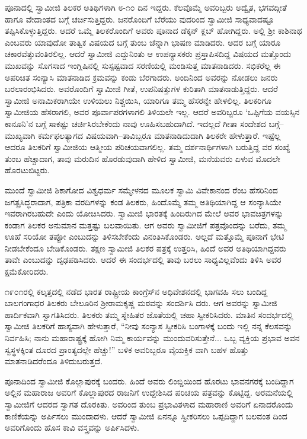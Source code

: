 ಪೂನಾದಲ್ಲಿ ಸ್ವಾಮೀಜಿ ತಿಲಕರ ಅತಿಥಿಗಳಾಗಿ ೮-೧೦ ದಿನ ಇದ್ದರು. ಕೆಲವೊಮ್ಮೆ ಅವರಿಬ್ಬರು ಅದ್ವೈತ, ಭಗವದ್ಗೀತೆ ಹಾಗೂ ವೇದಾಂತದ ಬಗ್ಗೆ ಚರ್ಚಿಸುತ್ತಿದ್ದರು. ಜನರೊಂದಿಗೆ ಬೆರೆಯು ವುದರಿಂದ ಸ್ವಾಮೀಜಿ ಸಾಧ್ಯವಾದಷ್ಟೂ ತಪ್ಪಿಸಿಕೊಳ್ಳುತ್ತಿದ್ದರು. ಆದರೆ ಒಮ್ಮೆ ತಿಲಕರೊಂದಿಗೆ ಅವರು ಪೂನಾದ ಡೆಕ್ಕನ್ ಕ್ಲಬ್ ಹೋಗಿದ್ದರು. ಅಲ್ಲಿ ಶ್ರೀ ಕಾಶಿನಾಥ ಎಂಬವರು ಯಾವುದೋ ತಾತ್ವಿಕ ವಿಷಯದ ಬಗ್ಗೆ ತುಂಬ ಚೆನ್ನಾಗಿ ಭಾಷಣ ಮಾಡಿದರು. ಅದರ ಬಗ್ಗೆ ಯಾರೂ ಚಕಾರವೆತ್ತುವಂತಿರಲಿಲ್ಲ. ಆದರೆ ಸ್ವಾಮೀಜಿ ಎದ್ದುನಿಂತು ಆ ಉಪನ್ಯಾಸಕರು ಪ್ರಸ್ತಾಪಿಸದಿದ್ದ ವಿಷಯದ ಮತ್ತೊಂದು ಮುಖವನ್ನು ಸೊಗಸಾದ ಇಂಗ್ಲಿಷಿನಲ್ಲಿ ಸುಸ್ಪಷ್ಟವಾದ ಸರಣಿಯಲ್ಲಿ ಮಂಡಿಸುತ್ತ ಮಾತನಾಡಿದರು. ಸಭಿಕರೆಲ್ಲ ಈ ಅಪರಿಚಿತ ಸಂನ್ಯಾಸಿ ಮಾತನಾಡಿದ ಕ್ರಮವನ್ನು ಕಂಡು ಬೆರಗಾದರು. ಅಂದಿನಿಂದ ಅವರನ್ನು ನೋಡಲು ಜನರು ಬರಲಾರಂಭಿಸಿದರು. ಅವರೊಂದಿಗೆ ಸ್ವಾಮೀಜಿ ಗೀತೆ, ಉಪನಿಷತ್ತುಗಳ ಕುರಿತಾಗಿ ಮಾತನಾಡುತ್ತಿದ್ದರು. ಆದರೆ ಸ್ವಾಮೀಜಿ ಅನಾಮಿಕರಾಗಿಯೇ ಉಳಿಯಲು ನಿಶ್ಚಯಿಸಿ, ಯಾರಿಗೂ ತಮ್ಮ ಹೆಸರನ್ನೇ ಹೇಳಲಿಲ್ಲ. ತಿಲಕರಿಗೂ ಸ್ವಾಮೀಜಿಯ ಹೆಸರಾಗಲಿ, ಅವರ ಪೂರ್ವಾಪರಗಳಾಗಲಿ ತಿಳಿಯಲೇ ಇಲ್ಲ. ಆದರೆ ಅವರಿಬ್ಬರೂ ‘ಒಪ್ಪಿಗೆಯ ವಯಸ್ಸಿನ ಕಾನೂನಿ’ನ ಬಗ್ಗೆ ಸಾಕಷ್ಟು ಚರ್ಚಿಸಿರಬೇಕೆಂದು ನಾವು ಊಹಿಸಬಹುದಾಗಿದೆ. ಇದಲ್ಲದೆ ಗೀತಾ ಸಂದೇಶದ ಬಗ್ಗೆ–ಮುಖ್ಯವಾಗಿ ಕರ್ಮಫಲತ್ಯಾಗದ ವಿಷಯವಾಗಿ–ತಾವಿಬ್ಬರೂ ಮಾತನಾಡಿದುದಾಗಿ ತಿಲಕರೇ ಹೇಳುತ್ತಾರೆ. ಇಷ್ಟೆಲ್ಲ ಆದರೂ ತಿಲಕರಿಗೆ ಸ್ವಾಮೀಜಿಯ ಆತ್ಮೀಯ ಪರಿಚಯವಾಗಲಿಲ್ಲ. ತಮ್ಮ ದರ್ಶನಾರ್ಥಿಗಳಾಗಿ ಬರುತ್ತಿದ್ದ ವರ ಸಂಖ್ಯೆ ತುಂಬ ಹೆಚ್ಚಾದಾಗ, ತಾವು ಮರುದಿನ ಹೊರಡುವುದಾಗಿ ಹೇಳಿದ ಸ್ವಾಮೀಜಿ, ಮನೆಯವರು ಏಳುವ ಮೊದಲೇ ಹೊರಟುಬಿಟ್ಟರು.

ಮುಂದೆ ಸ್ವಾಮೀಜಿ ಶಿಕಾಗೋದ ವಿಶ್ವಧರ್ಮ ಸಮ್ಮೇಳನದ ಮೂಲಕ ಸ್ವಾಮಿ ವಿವೇಕಾನಂದ ರೆಂಬ ಹೆಸರಿನಿಂದ ಜಗತ್ಪ್ರಸಿದ್ಧರಾದಾಗ, ಪತ್ರಿಕಾ ವರದಿಗಳನ್ನು ಕಂಡ ತಿಲಕರು, ಹಿಂದೊಮ್ಮೆ ತಮ್ಮ ಅತಿಥಿಯಾಗಿದ್ದ ಆ ಸಂನ್ಯಾಸಿಯೇ ಇವರಾಗಿರಬಹುದೇ ಎಂದು ಯೋಚಿಸಿದರು. ಸ್ವಾಮೀಜಿ ಭಾರತಕ್ಕೆ ಹಿಂದಿರುಗಿದ ಮೇಲೆ ಅವರ ಭಾವಚಿತ್ರಗಳನ್ನು ಕಂಡಾಗ ತಿಲಕರ ಅನುಮಾನ ಮತ್ತಷ್ಟು ಬಲವಾಯಿತು. ಆಗ ಅವರು ಸ್ವಾಮೀಜಿಗೆ ಪತ್ರವೊಂದನ್ನು ಬರೆದು, ತಮ್ಮ ಊಹೆ ಸರಿಯೋ ತಪ್ಪೋ ಎಂಬುದನ್ನು ತಿಳಿಸಬೇಕೆಂದು ವಿನಂತಿಸಿಕೊಂಡರು. ಅಲ್ಲದೆ ಮತ್ತೊಮ್ಮೆ ಪೂನಾಗೆ ಭೇಟಿ ನೀಡಬೇಕೆಂದೂ ಬೇಡಿಕೊಂಡರು. ತಕ್ಷಣ ಸ್ವಾಮೀಜಿ ತಿಲಕರ ಪತ್ರಕ್ಕೆ ಉತ್ತರಿಸಿ, ಹಿಂದೆ ಅವರ ಅತಿಥಿಯಾಗಿದ್ದವರು ತಾವೇ ಎಂಬುದನ್ನು ದೃಢಪಡಿಸಿದರು. ಆದರೆ ಈ ಸಂದರ್ಭದಲ್ಲಿ ತಾವು ಬರಲು ಸಾಧ್ಯವಿಲ್ಲವೆಂದು ತಿಳಿಸಿ ಅವರ ಕ್ಷಮೆಕೋರಿದರು.

೧೯೦೧ರಲ್ಲಿ ಕಲ್ಕತ್ತದಲ್ಲಿ ನಡೆದ ಭಾರತ ರಾಷ್ಟ್ರೀಯ ಕಾಂಗ್ರೆಸ್​ನ ಅಧಿವೇಶನದಲ್ಲಿ ಭಾಗವಹಿ ಸಲು ಬಂದಿದ್ದ ಬಾಲಗಂಗಾಧರ ತಿಲಕರು ಬೇಲೂರಿನ ಶ್ರೀರಾಮಕೃಷ್ಣ ಮಠವನ್ನು ಸಂದರ್ಶಿಸಿ ದರು. ಆಗ ಅವರನ್ನು ಸ್ವಾಮೀಜಿ ಹಾರ್ದಿಕವಾಗಿ ಸ್ವಾಗತಿಸಿದರು. ತಿಲಕರು ತಮ್ಮ ಸ್ನೇಹಿತರ ಜೊತೆಯಲ್ಲಿ ಚಹಾ ಸ್ವೀಕರಿಸಿದರು. ಮಾತಿನ ಸಂದರ್ಭದಲ್ಲಿ ಸ್ವಾಮೀಜಿ ತಿಲಕರಿಗೆ ಹಾಸ್ಯವಾಗಿ ಹೇಳುತ್ತಾರೆ, “ನೀವು ಸಂನ್ಯಾಸ ಸ್ವೀಕರಿಸಿ ಬಂಗಾಳಕ್ಕೆ ಬಂದು ಇಲ್ಲಿ ನನ್ನ ಕೆಲಸವನ್ನು ನಿರ್ವಹಿಸಿ; ನಾನು ಮಹಾರಾಷ್ಟ್ರಕ್ಕೆ ಹೋಗಿ ನಿಮ್ಮ ಕಾರ್ಯವನ್ನು ಮುಂದುವರಿಸುತ್ತೇನೆ... ಒಬ್ಬ ವ್ಯಕ್ತಿಯ ಪ್ರಭಾವ ಅವನ ಸ್ವಸ್ಥಳಕ್ಕಿಂತ ದೂರದ ಪ್ರಾಂತ್ಯದಲ್ಲೇ ಹೆಚ್ಚು!” ಬಳಿಕ ಅವರಿಬ್ಬರೂ ವೈಯಕ್ತಿಕ ವಾಗಿ ಬಹಳ ಹೊತ್ತು ಮಾತನಾಡಿದರೆಂದೂ ತಿಳಿದುಬರುತ್ತದೆ.

ಪೂನಾದಿಂದ ಸ್ವಾಮೀಜಿ ಕೊಲ್ಲಾಪುರಕ್ಕೆ ಬಂದರು. ಹಿಂದೆ ಅವರು ಲಿಂಬ್ಡಿಯಿಂದ ಹೊರಟು ಭಾವನಗರಕ್ಕೆ ಬಂದಿದ್ದಾಗ ಅಲ್ಲಿನ ಮಹಾರಾಜ ಅವರಿಗೆ ಕೊಲ್ಲಾಪುರದ ರಾಜನಿಗೆ ಉದ್ದೇಶಿಸಿದ ಪರಿಚಯ ಪತ್ರವನ್ನು ಕೊಟ್ಟಿದ್ದ. ಅರಮನೆಯಲ್ಲಿ ಸ್ವಾಮೀಜಿಗೆ ಆದರದ ಸ್ವಾಗತ ದೊರಕಿತು. ಅವರಿಂದ ತುಂಬ ಪ್ರಭಾವಿತಳಾದ ಮಹಾರಾಣಿ ಅವರಿಗೆ ಏನಾದರೊಂದು ಕಾಣಿಕೆಯನ್ನು ಅರ್ಪಿಸಲು ಮುಂದಾದಳು. ಆದರೆ ಸ್ವಾಮೀಜಿ ಏನನ್ನೂ ಸ್ವೀಕರಿಸಲು ಒಪ್ಪದಿದ್ದಾಗ ಬಲವಂತ ದಿಂದ ಅವರಿಗೊಂದು ಹೊಸ ಕಾವಿ ವಸ್ತ್ರವನ್ನು ಅರ್ಪಿಸಿದಳು.

